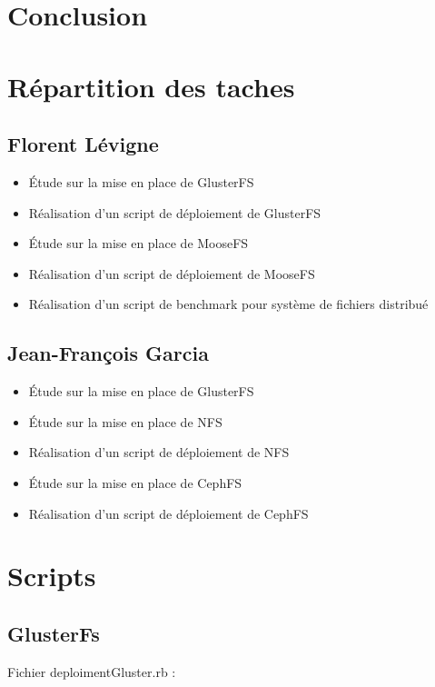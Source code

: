 \documentclass[12pt]{report}
\begin{document}
	\chapter{Conclusion}

	\appendix
		\chapter{Répartition des taches}
			\section{Florent Lévigne}
				\begin{itemize}
					\item Étude sur la mise en place de GlusterFS
					\item Réalisation d'un script de déploiement de GlusterFS
					\item Étude sur la mise en place de MooseFS
					\item Réalisation d'un script de déploiement de MooseFS
					\item Réalisation d'un script de benchmark pour système de fichiers distribué
				\end{itemize}
			\section{Jean-François Garcia}
				\begin{itemize}
					\item Étude sur la mise en place de GlusterFS
					\item Étude sur la mise en place de NFS
					\item Réalisation d'un script de déploiement de NFS
					\item Étude sur la mise en place de CephFS
					\item Réalisation d'un script de déploiement de CephFS
				\end{itemize}

		\chapter{Scripts}
			\section{GlusterFs}
				Fichier deploimentGluster.rb :
				
\end{document}
